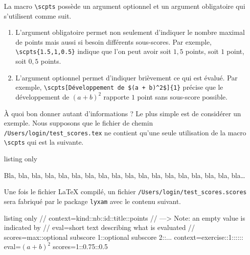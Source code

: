 \documentclass[12pt,a4paper]{scrartcl}
\begin{document}
La macro \verb+\scpts+ possède un argument optionnel et un argument obligatoire qui s'utilisent comme suit.
\begin{enumerate}
	\item L'argument obligatoire permet non seulement d'indiquer le nombre maximal de points mais aussi si besoin différents sous-scores.
	Par exemple, \verb+\scpts{1.5,1,0.5}+ indique que l'on peut avoir soit $1,\!5$ points, soit $1$ point, soit $0,\!5$ points.

	\item L'argument optionnel permet d'indiquer brièvement ce qui est évalué.
	Par exemple, \verb&\scpts[Développement de $(a + b)^2$]{1}& précise que le développement de $(a + b)^2$ rapporte $1$ point sans sous-score possible.
\end{enumerate}


\medskip

À quoi bon donner autant d'informations ? Le plus simple est de considérer un exemple.
Nous supposons que le fichier de chemin \verb+/Users/login/test_scores.tex+ ne contient qu'une seule utilisation de la macro \verb+\scpts+ qui est la suivante.

\begin{tcblisting}{listing only}
\exercise

 Bla, bla, bla, bla, bla, bla, bla, bla, bla,
bla, bla, bla, bla, bla, bla, bla, bla, bla\dots
\end{tcblisting}


Une fois le fichier \LaTeX{} compilé, un fichier \verb+/Users/login/test_scores.scores+ sera fabriqué par le package \verb+lyxam+ avec le contenu suivant.

\begin{tcblisting}{listing only}
// context=kind::nb::id::title::points
// ---> Note: an empty value is indicated by {}
// eval=short text describing what is evaluated
// scores=max::optional subscore 1::optional subscore 2::...
context=exercise::1::{}::{}::{}
eval=$(a + b)^2$
scores=1::0.75::0.5
\end{tcblisting}
\end{document}
